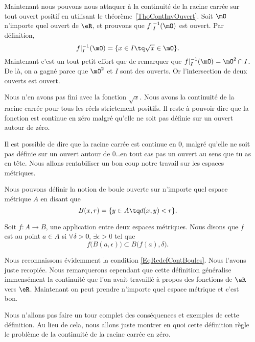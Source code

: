 Maintenant nous pouvons nous attaquer à la continuité de la racine carrée sur tout ouvert positif en utilisant le théorème~\ref{ThoContInvOuvert}. Soit $\mO$ n'importe quel ouvert de $\eR$, et prouvons que $f|_I^{-1}(\mO)$ est ouvert. Par définition,
\begin{equation}
	f|_I^{-1}(\mO)=\{ x\in I\tq \sqrt{x}\in\mO \}.
\end{equation}
Maintenant c'est un tout petit effort que de remarquer que $f|_I^{-1}(\mO)=\mO^2\cap I$. De là, on a gagné parce que $\mO^2$ et $I$ sont des ouverts. Or l'intersection de deux ouverts est ouvert.

Nous n'en avons pas fini avec la fonction $\sqrt{x}$. Nous avons la continuité de la racine carrée pour tous les réels strictement positifs. Il reste à pouvoir dire que la fonction est continue en zéro malgré qu'elle ne soit pas définie sur un ouvert autour de zéro.

Il est possible de dire que la racine carrée est continue en $0$, malgré qu'elle ne soit pas définie sur un ouvert autour de $0$\ldots en tout cas pas un ouvert au sens que tu as en tête. Nous allons rentabiliser un bon coup notre travail sur les espaces métriques.

Nous pouvons définir la notion de boule ouverte sur n'importe quel espace métrique $A$ en disant que
\[
	B(x,r)=\{ y\in A\tq d(x,y)<r \}.
\]
\begin{definition}      \label{DefContMetrique}
	Soit $f\colon A\to B$, une application entre deux espaces métriques. Nous disons que $f$ est  au point $a\in A$ si $\forall \delta>0$, $\exists\epsilon>0$ tel que
	\begin{equation}
		f\big( B(a,\epsilon) \big)\subset B\big( f(a),\delta \big).
	\end{equation}
\end{definition}
Nous reconnaissons évidemment la condition \eqref{EqRedefContBoules}. Nous l'avons juste recopiée. Nous remarquerons cependant que cette définition généralise immensément la continuité que l'on avait travaillé à propos des fonctions de $\eR$ vers $\eR$. Maintenant on peut prendre n'importe quel espace métrique et c'est bon.

Nous n'allons pas faire un tour complet des conséquences et exemples de cette définition. Au lieu de cela, nous allons juste montrer en quoi cette définition règle le problème de la continuité de la racine carrée en zéro.

